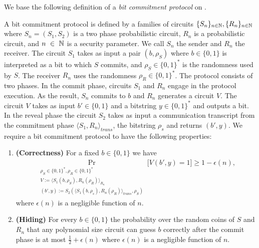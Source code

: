 We base the following definition of a \textit{bit commitment protocol} on \cite{LectureNotesComThCrypto}.
\begin{definition}
  \label{def:bit_commitment}
A \textnormal{bit commitment protocol} is defined by a families of circuits $\{S_n\}_{n \in \mathbb{N}}, \{R_n\}_{n \in \mathbb{N}}$
where $S_n = (S_1, S_2)$ is a two phase probabilistic circuit, $R_n$ is a probabilistic circuit, and
$n~\in~\mathbb{N}$ is a security parameter. We call $S_n$ the sender and $R_n$ the receiver.
The circuit $S_1$ takes as input a pair $(b, \rho_S)$
where $b \in \{0,1\}$ is interpreted as a bit to which $S$ commits, and $\rho_S \in \{0,1\}^{*}$ is the randomness used by $S$.
The receiver $R_n$ uses the randomness $\rho_R \in \{0,1\}^{*}$.
The protocol consists of two phases. In the \textnormal{commit phase}, circuits $S_1$ and $R_n$ engage in the protocol execution.
As the result, $S_n$ commits to $b$ and $R_n$ generates a circuit $V$.
The circuit $V$ takes as input $b' \in \{0,1\}$ and a bitstring $y \in \{0,1\}^{*}$ and outputs a bit.
In the \textnormal{reveal phase} the circuit $S_2$ takes as input a communication transcript from the commitment phase
$\langle S_1, R_n \rangle_{\mathit{trans}}$, the bitstring $\rho_s$ and returns $(b', y)$.
We require a bit commitment protocol to have the following properties:
\begin{enumerate}[]
\item{\textnormal{\textbf{(Correctness)}}} For a fixed $b \in \{0,1\}$ we have
  \begin{align*}
    \underset{\substack{\rho_S \in \{0,1\}^{*}, \rho_R \in \{0,1\}^{*} \\
        V := \langle S_1(b,\rho_S), R_n(\rho_R) \rangle_{R_n} \\
        (b',y) := S_2(\langle S_1(b,\rho_s), R_n(\rho_R) \rangle_{\mathit{trans}},\rho_S)}}{\Pr}\Big[V(b',y) = 1 \Big] \geq 1 - \epsilon(n),
  \end{align*}
where $\epsilon(n)$ is a negligible function of $n$.
\item{\textnormal{\textbf{(Hiding)}}}
  For every $b \in \{0,1\}$ the probability over the random coins of $S$ and $R_n$ that any polynomial size circuit
  can guess $b$ correctly after the commit phase is at most $\frac{1}{2} + \epsilon(n)$ where $\epsilon(n)$ is a negligible function of $n$.

\end{enumerate}
\end{definition}
